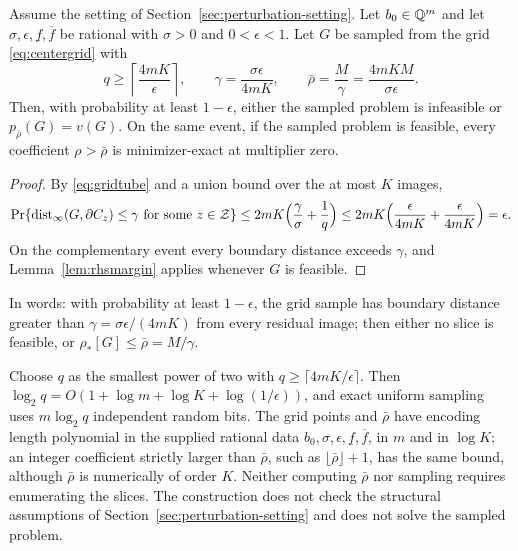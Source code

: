 \begin{theorem}\label{thm:gridsmoothing}
Assume the setting of Section~\ref{sec:perturbation-setting}. Let
$b_0\in\mathbb Q^m$ and let $\sigma,\epsilon,\underline f,\overline f$ be
rational with $\sigma>0$ and $0<\epsilon<1$. Let $G$ be sampled from the
grid \eqref{eq:centergrid} with
\begin{equation}\label{eq:gridsmoothing}
 q\ge\left\lceil\frac{4mK}{\epsilon}\right\rceil,\qquad
 \gamma=\frac{\sigma\epsilon}{4mK},\qquad
 \bar\rho=\frac M\gamma=\frac{4mKM}{\sigma\epsilon}.
\end{equation}
Then, with probability at least $1-\epsilon$, either the sampled problem
is infeasible or $p_{\bar\rho}(G)=v(G)$. On the same event, if the
sampled problem is feasible, every coefficient $\rho>\bar\rho$ is
minimizer-exact at multiplier zero.
\end{theorem}
\begin{proof}
By \eqref{eq:gridtube} and a union bound over the at most $K$ images,
\[
 \Pr\{\operatorname{dist}_\infty(G,\partial C_z)\le\gamma
      \text{ for some }z\in\mathcal Z\}
 \le2mK\Bigl(\frac\gamma\sigma+\frac1q\Bigr)
 \le2mK\Bigl(\frac\epsilon{4mK}+\frac\epsilon{4mK}\Bigr)=\epsilon.
\]
On the complementary event every boundary distance exceeds $\gamma$, and
Lemma~\ref{lem:rhsmargin} applies whenever $G$ is feasible.
\end{proof}
In words: with probability at least $1-\epsilon$, the grid sample has
boundary distance greater than $\gamma=\sigma\epsilon/(4mK)$ from every
residual image; then either no slice is feasible, or
$\rho_*[G]\le\bar\rho=M/\gamma$.

\begin{remark}[Encoding]\label{rem:gridencoding}
Choose $q$ as the smallest power of two with
$q\ge\lceil4mK/\epsilon\rceil$. Then
$\log_2q=O(1+\log m+\log K+\log(1/\epsilon))$, and exact uniform sampling
uses $m\log_2q$ independent random bits. The grid points and $\bar\rho$
have encoding length polynomial in the supplied rational data
$b_0,\sigma,\epsilon,\underline f,\overline f$, in $m$ and in $\log K$; an
integer coefficient strictly larger than $\bar\rho$, such as
$\lfloor\bar\rho\rfloor+1$, has the same bound, although $\bar\rho$ is
numerically of order $K$. Neither computing $\bar\rho$ nor sampling
requires enumerating the slices. The construction does not check the
structural assumptions of Section~\ref{sec:perturbation-setting} and
does not solve the sampled problem.
\end{remark}

